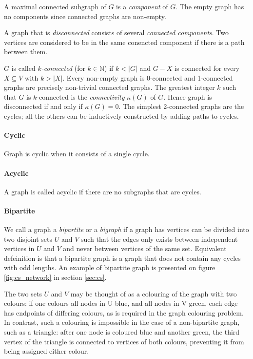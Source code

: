           A maximal connected subgraph of $G$ is a \emph{component} of $G$. The empty graph has no components since connected graphs are non-empty. 

          A graph that is \emph{disconnected} consists of several \emph{connected components}. Two vertices are considered to be in the same conencted component if there is a path between them.

          $G$ is called $k$\emph{-connected} (for $k \in \mathbb{N}$) if $k < |G|$ and $G - X$ is connected for every $X \subseteq V$ with $k > |X|$. Every non-empty graph is 0-connected and 1-connected graphs are precisely non-trivial connected graphs. The greatest integer $k$ such that $G$ is $k$-connected is the \emph{connectivity} $\kappa(G)$ of $G$. Hence graph is disconnected if and only if $\kappa(G) = 0$. The simplest 2-connected graphs are the cycles; all the others can be inductively constructed by adding paths to cycles.

        \paragraph{Cyclic}
        
          Graph is cyclic when it consists of a single cycle.
          
        \paragraph{Acyclic}
        
          A graph is called acyclic if there are no subgraphs that are cycles.

        \paragraph{Bipartite}
        
          We call a graph a \emph{bipartite} or a \emph{bigraph} if a graph has vertices can be divided into two disjoint sets $U$ and $V$ such that the edges only exists between independent vertices in $U$ and $V$ and never between vertices of the same set\cite{Diestel2012}. Equivalent defeinition is that a bipartite graph is a graph that does not contain any cycles with odd lengths\cite{AsratianDenleyHaggkvist}. An example of bipartite graph is presented on figure \ref{fig:cs_network} in section \ref{sec:cs}.

          The two sets $U$ and $V$ may be thought of as a colouring of the graph with two colours: if one colours all nodes in U blue, and all nodes in V green, each edge has endpoints of differing colours, as is required in the graph colouring problem\cite{AsratianDenleyHaggkvist,Scheinerman2012}. In contrast, such a colouring is impossible in the case of a non-bipartite graph, such as a triangle: after one node is coloured blue and another green, the third vertex of the triangle is connected to vertices of both colours, preventing it from being assigned either colour.
          
